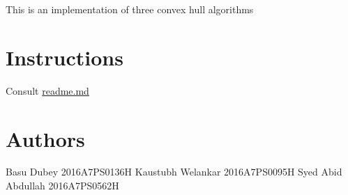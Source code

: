 This is an implementation of three convex hull algorithms \hypertarget{index_Instructions}{}\section{Instructions}\label{index_Instructions}
Consult \mbox{\hyperlink{_r_e_a_d_m_e_8md}{readme.\+md}} \hypertarget{index_Authors}{}\section{Authors}\label{index_Authors}
\begin{DoxyVerb}Basu Dubey          2016A7PS0136H
Kaustubh Welankar       2016A7PS0095H
Syed Abid Abdullah  2016A7PS0562H
\end{DoxyVerb}
 